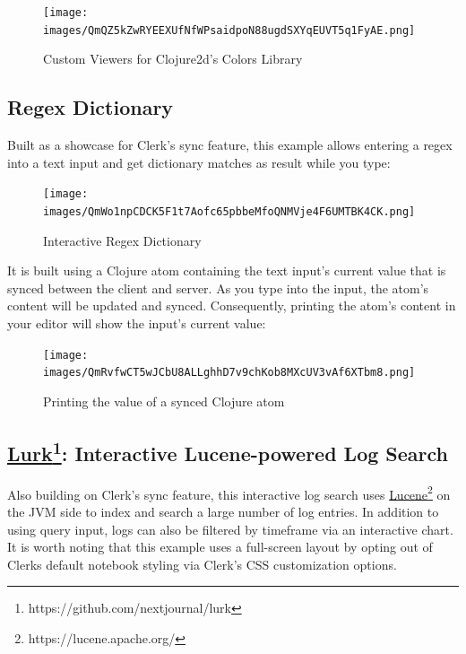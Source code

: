 \documentclass[sigconf,screen,pbalance=true]{acmart}
\begin{document}
\begin{figure}
\hypertarget{custom-viewers-for-clojure2ds-colors-library}{%
\centering
\texttt{[image: images/QmQZ5kZwRYEEXUfNfWPsaidpoN88ugdSXYqEUVT5q1FyAE.png]}
\caption{Custom Viewers for Clojure2d's Colors Library}\label{custom-viewers-for-clojure2ds-colors-library}
}
\end{figure}

\hypertarget{regex-dictionary}{%
\subsection{Regex Dictionary}\label{regex-dictionary}}

Built as a showcase for Clerk's sync feature, this example allows entering a regex into a text input and get dictionary matches as result while you type:

\begin{figure}
\hypertarget{interactive-regex-dictionary}{%
\centering
\texttt{[image: images/QmWo1npCDCK5F1t7Aofc65pbbeMfoQNMVje4F6UMTBK4CK.png]}
\caption{Interactive Regex Dictionary}\label{interactive-regex-dictionary}
}
\end{figure}

It is built using a Clojure atom containing the text input's current value that is synced between the client and server. As you type into the input, the atom's content will be updated and synced. Consequently, printing the atom's content in your editor will show the input's current value:

\begin{figure}
\hypertarget{printing-the-value-of-a-synced-clojure-atom}{%
\centering
\texttt{[image: images/QmRvfwCT5wJCbU8ALLghhD7v9chKob8MXcUV3vAf6XTbm8.png]}
\caption{Printing the value of a synced Clojure atom}\label{printing-the-value-of-a-synced-clojure-atom}
}
\end{figure}

\hypertarget{lurk:-interactive-lucene-powered-log-search}{%
\subsection[: Interactive Lucene-powered Log Search]{\texorpdfstring{{\href{https://github.com/nextjournal/lurk}{Lurk}\footnote{https://github.com/nextjournal/lurk}}: Interactive Lucene-powered Log Search}{Lurk: Interactive Lucene-powered Log Search}}\label{lurk:-interactive-lucene-powered-log-search}}

Also building on Clerk's sync feature, this interactive log search uses {\href{https://lucene.apache.org/}{Lucene}\footnote{https://lucene.apache.org/}} on the JVM side to index and search a large number of log entries. In addition to using query input, logs can also be filtered by timeframe via an interactive chart. It is worth noting that this example uses a full-screen layout by opting out of Clerk\textquotesingle s default notebook styling via Clerk's CSS customization options.
\end{document}
